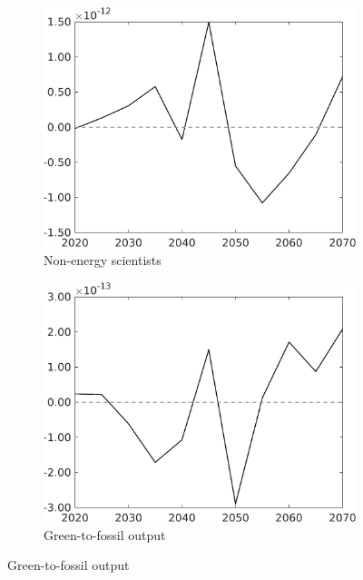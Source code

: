 \begin{figure}[h!!!]
\begin{subfigure}{0.4\textwidth}
	\end{subfigure}
	\begin{subfigure}{0.4\textwidth}
		\caption{Non-energy scientists}
		\includegraphics[width=1\textwidth]{../../codding_model/own_basedOnFried/optimalPol_010922_revision/figures/all_13Sept22_Tplus30/CountTAUFPerDif_Opt_target_sn_nsk1_xgr0_knspil0_regime4_spillover0_sep0_extern0_PV1_etaa0.79.png}
	\end{subfigure}
	\begin{subfigure}{0.4\textwidth}
		\caption{Green-to-fossil output}
		\includegraphics[width=1\textwidth]{../../codding_model/own_basedOnFried/optimalPol_010922_revision/figures/all_13Sept22_Tplus30/CountTAUFPerDif_Opt_target_GFF_nsk1_xgr0_knspil0_regime4_spillover0_sep0_extern0_PV1_etaa0.79.png}
	\end{subfigure}
\end{figure}

